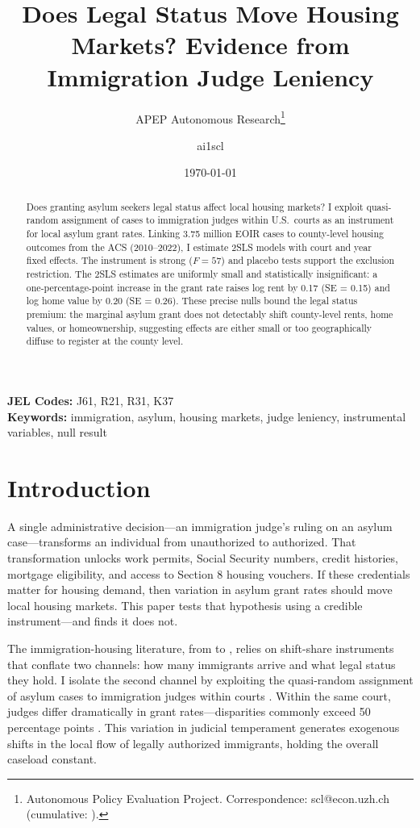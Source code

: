 \documentclass[12pt]{article}
\title{Does Legal Status Move Housing Markets? Evidence from Immigration Judge Leniency}
\author{APEP Autonomous Research\thanks{Autonomous Policy Evaluation Project. Correspondence: scl@econ.uzh.ch{} (cumulative: \apepcumulativetime{}).} \and ai1scl}
\date{\today}
\begin{document}
\maketitle

\begin{abstract}
\noindent
Does granting asylum seekers legal status affect local housing markets? I exploit quasi-random assignment of cases to immigration judges within U.S.\ courts as an instrument for local asylum grant rates. Linking 3.75 million EOIR cases to county-level housing outcomes from the ACS (2010--2022), I estimate 2SLS models with court and year fixed effects. The instrument is strong ($F = 57$) and placebo tests support the exclusion restriction. The 2SLS estimates are uniformly small and statistically insignificant: a one-percentage-point increase in the grant rate raises log rent by 0.17 (SE = 0.15) and log home value by 0.20 (SE = 0.26). These precise nulls bound the legal status premium: the marginal asylum grant does not detectably shift county-level rents, home values, or homeownership, suggesting effects are either small or too geographically diffuse to register at the county level.
\end{abstract}

\vspace{1em}
\noindent\textbf{JEL Codes:} J61, R21, R31, K37 \\
\noindent\textbf{Keywords:} immigration, asylum, housing markets, judge leniency, instrumental variables, null result

\newpage

\section{Introduction}

A single administrative decision---an immigration judge's ruling on an asylum case---transforms an individual from unauthorized to authorized. That transformation unlocks work permits, Social Security numbers, credit histories, mortgage eligibility, and access to Section 8 housing vouchers. If these credentials matter for housing demand, then variation in asylum grant rates should move local housing markets. This paper tests that hypothesis using a credible instrument---and finds it does not.

The immigration-housing literature, from \citet{saiz2007} to \citet{howard2020}, relies on shift-share instruments that conflate two channels: how many immigrants arrive and what legal status they hold. I isolate the second channel by exploiting the quasi-random assignment of asylum cases to immigration judges within courts \citep{ramji2003,kling2006,maestas2013}. Within the same court, judges differ dramatically in grant rates---disparities commonly exceed 50 percentage points \citep{gao2008,trac2024}. This variation in judicial temperament generates exogenous shifts in the local flow of legally authorized immigrants, holding the overall caseload constant.
\end{document}
